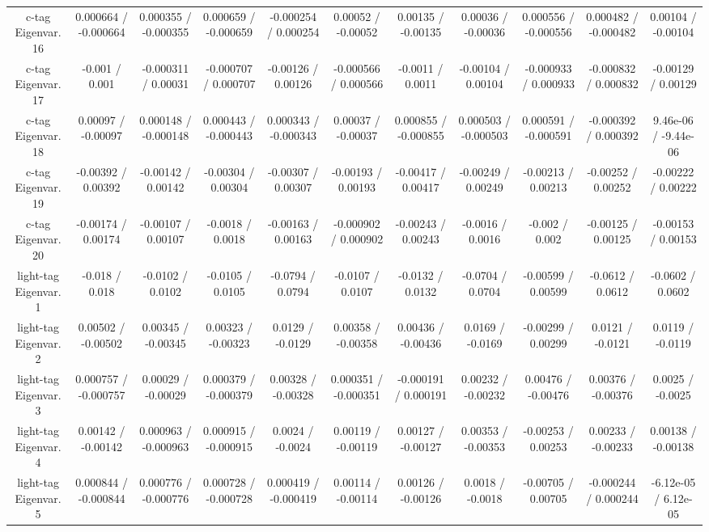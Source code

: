 \begin{table}[htbp]
\begin{center}
\begin{tabular}{|c|c|c|c|c|c|c|c|c|c|c|}
  c-tag Eigenvar. 16 & 0.000664 / -0.000664 & 0.000355 / -0.000355 & 0.000659 / -0.000659 & -0.000254 / 0.000254 & 0.00052 / -0.00052 & 0.00135 / -0.00135 & 0.00036 / -0.00036 & 0.000556 / -0.000556 & 0.000482 / -0.000482 & 0.00104 / -0.00104 \\ 
  c-tag Eigenvar. 17 & -0.001 / 0.001 & -0.000311 / 0.00031 & -0.000707 / 0.000707 & -0.00126 / 0.00126 & -0.000566 / 0.000566 & -0.0011 / 0.0011 & -0.00104 / 0.00104 & -0.000933 / 0.000933 & -0.000832 / 0.000832 & -0.00129 / 0.00129 \\ 
  c-tag Eigenvar. 18 & 0.00097 / -0.00097 & 0.000148 / -0.000148 & 0.000443 / -0.000443 & 0.000343 / -0.000343 & 0.00037 / -0.00037 & 0.000855 / -0.000855 & 0.000503 / -0.000503 & 0.000591 / -0.000591 & -0.000392 / 0.000392 & 9.46e-06 / -9.44e-06 \\ 
  c-tag Eigenvar. 19 & -0.00392 / 0.00392 & -0.00142 / 0.00142 & -0.00304 / 0.00304 & -0.00307 / 0.00307 & -0.00193 / 0.00193 & -0.00417 / 0.00417 & -0.00249 / 0.00249 & -0.00213 / 0.00213 & -0.00252 / 0.00252 & -0.00222 / 0.00222 \\ 
  c-tag Eigenvar. 20 & -0.00174 / 0.00174 & -0.00107 / 0.00107 & -0.0018 / 0.0018 & -0.00163 / 0.00163 & -0.000902 / 0.000902 & -0.00243 / 0.00243 & -0.0016 / 0.0016 & -0.002 / 0.002 & -0.00125 / 0.00125 & -0.00153 / 0.00153 \\ 
  light-tag Eigenvar. 1 & -0.018 / 0.018 & -0.0102 / 0.0102 & -0.0105 / 0.0105 & -0.0794 / 0.0794 & -0.0107 / 0.0107 & -0.0132 / 0.0132 & -0.0704 / 0.0704 & -0.00599 / 0.00599 & -0.0612 / 0.0612 & -0.0602 / 0.0602 \\ 
  light-tag Eigenvar. 2 & 0.00502 / -0.00502 & 0.00345 / -0.00345 & 0.00323 / -0.00323 & 0.0129 / -0.0129 & 0.00358 / -0.00358 & 0.00436 / -0.00436 & 0.0169 / -0.0169 & -0.00299 / 0.00299 & 0.0121 / -0.0121 & 0.0119 / -0.0119 \\ 
  light-tag Eigenvar. 3 & 0.000757 / -0.000757 & 0.00029 / -0.00029 & 0.000379 / -0.000379 & 0.00328 / -0.00328 & 0.000351 / -0.000351 & -0.000191 / 0.000191 & 0.00232 / -0.00232 & 0.00476 / -0.00476 & 0.00376 / -0.00376 & 0.0025 / -0.0025 \\ 
  light-tag Eigenvar. 4 & 0.00142 / -0.00142 & 0.000963 / -0.000963 & 0.000915 / -0.000915 & 0.0024 / -0.0024 & 0.00119 / -0.00119 & 0.00127 / -0.00127 & 0.00353 / -0.00353 & -0.00253 / 0.00253 & 0.00233 / -0.00233 & 0.00138 / -0.00138 \\ 
  light-tag Eigenvar. 5 & 0.000844 / -0.000844 & 0.000776 / -0.000776 & 0.000728 / -0.000728 & 0.000419 / -0.000419 & 0.00114 / -0.00114 & 0.00126 / -0.00126 & 0.0018 / -0.0018 & -0.00705 / 0.00705 & -0.000244 / 0.000244 & -6.12e-05 / 6.12e-05 \\ 

\end{tabular}
\end{center}
\end{table}
